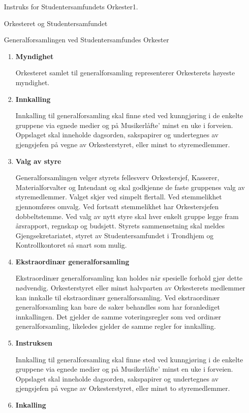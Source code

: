 \begin{instruks}{Instruks for Studentersamfundets Orkester}{1. }{ }
\begin{instruksledd}{Orkesteret og Studentersamfundet}
\end{instruksledd}

\begin{instruksledd}{Generalforsamlingen ved Studentersamfundes Orkester}
    \begin{enumerate}
    \item \textbf{Myndighet}

    Orkesteret samlet til generalforsamling representerer Orkesterets høyeste myndighet.

    \item \textbf{Innkalling}

    Innkalling til generalforsamling skal finne sted ved kunngjøring i de enkelte gruppene via
egnede medier og
på Musikerlåfte' minst en uke i forveien. Oppslaget skal inneholde dagsorden, sakspapirer og
undertegnes av
gjengsjefen på vegne av Orkesterstyret, eller minst to styremedlemmer.

    \item \textbf{Valg av styre}

Generalforsamlingen velger styrets fellesverv Orkestersjef, Kasserer, Materialforvalter og Intendant
og skal
godkjenne de faste gruppenes valg av styremedlemmer. Valget skjer ved simpelt flertall. Ved
stemmelikhet
gjennomføres omvalg. Ved fortsatt stemmelikhet har Orkestersjefen dobbeltstemme. Ved valg av nytt
styre
skal hver enkelt gruppe legge fram årsrapport, regnskap og budsjett. Styrets sammensetning skal
meldes
Gjengsekretariatet, styret av Studentersamfundet i Trondhjem og Kontrollkontoret så snart som mulig.

    \item \textbf{Ekstraordinær generalforsamling}

Ekstraordinær generalforsamling kan holdes når spesielle forhold gjør dette nødvendig.
Orkesterstyret eller
minst halvparten av Orkesterets medlemmer kan innkalle til ekstraordinær generalforsamling. Ved
ekstraordinær generalforsamling kan bare de saker behandles som har foranlediget innkallingen. Det
gjelder
de samme voteringsregler som ved ordinær generalforsamling, likeledes gjelder de samme regler for
innkalling.

    \item \textbf{Instruksen}

    Innkalling til generalforsamling skal finne sted ved kunngjøring i de enkelte gruppene via
egnede medier og
på Musikerlåfte' minst en uke i forveien. Oppslaget skal inneholde dagsorden, sakspapirer og
undertegnes av
gjengsjefen på vegne av Orkesterstyret, eller minst to styremedlemmer.
    \item \textbf{Inkalling}


\end{enumerate}
\end{instruksledd}
\end{instruks}
